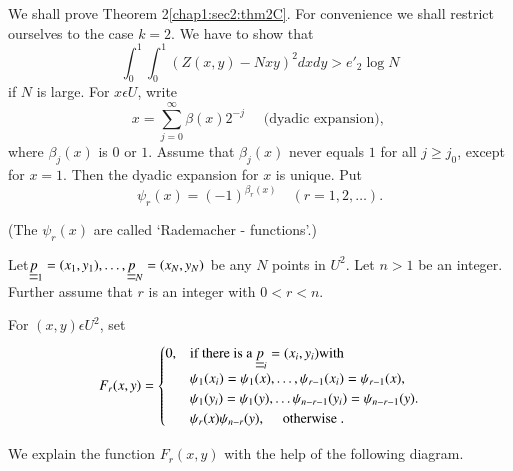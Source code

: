 We shall prove Theorem 2\ref{chap1:sec2:thm2C}. For convenience we shall restrict ourselves to the case $k = 2$. We have to show that
$$
\int_{0}^{1} \int_{0}^{1} (Z(x, y) - Nxy)^{2} dx dy > e'_{2} \log N
$$
if $N$ is large. For $x \epsilon U$, write
$$
x = \sum_{j=0}^{\infty} \beta(x) 2^{-j}\quad\text{ (dyadic expansion), }
$$ 
where $\beta_{j}(x)$ is $0$ or $1$. Assume that $\beta_{j}(x)$ never equals $1$ for all $j \geq j_{0}$, except for $x = 1$. Then the dyadic expansion for $x$ is unique. Put
$$
\psi_{r}(x) = (-1)^{\beta_{r}(x)} \quad(r = 1, 2, \ldots).
$$

(The $\psi_{r}(x)$ are called `Rademacher - functions'.)

Let\pageoriginale $\underline{\underline{p}}_{1} = (x_{1}, y_{1}), \ldots, \underline{\underline{p}}_{N} = (x_{N}, y_{N})$ be any $N$ points in $U^{2}$. Let $n > 1$ be an integer. Further assume that $r$ is an integer with $0 < r < n$.

For $(x, y) \epsilon U^{2}$, set
$$ F_{r} (x, y) =
\begin{cases}
0, & \text{if there is a }\underline{\underline{p}}_{i} = (x_{i}, y_{i}) \text{with}\\ 
   & \psi_{1}(x_{i}) = \psi_{1}(x), \ldots, \psi_{r-1}(x_{i}) = \psi_{r-1}(x),\\
   & \psi_{1}(y_{i}) = \psi_{1}(y), \ldots \psi_{n-r-1}(y_{i}) = \psi_{n-r-1}(y).\\
& \psi_{r}(x) \psi_{n-r}(y),\quad\text{ otherwise }.
\end{cases}
$$

We explain the function $F_{r} (x, y)$ with the help of the following diagram.
\begin{figure}[H]
\end{figure}

